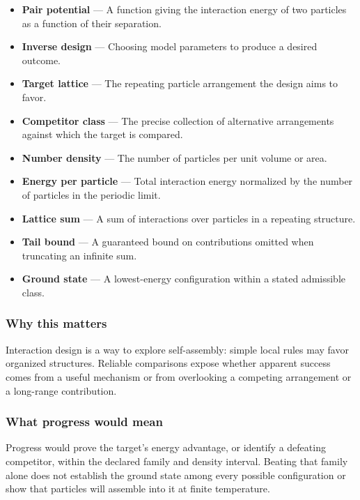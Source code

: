\documentclass[
  11pt,
]{article}
\begin{document}
\begin{itemize}
\item
  \textbf{Pair potential} --- A function giving the interaction energy
  of two particles as a function of their separation.
\item
  \textbf{Inverse design} --- Choosing model parameters to produce a
  desired outcome.
\item
  \textbf{Target lattice} --- The repeating particle arrangement the
  design aims to favor.
\item
  \textbf{Competitor class} --- The precise collection of alternative
  arrangements against which the target is compared.
\item
  \textbf{Number density} --- The number of particles per unit volume or
  area.
\item
  \textbf{Energy per particle} --- Total interaction energy normalized
  by the number of particles in the periodic limit.
\item
  \textbf{Lattice sum} --- A sum of interactions over particles in a
  repeating structure.
\item
  \textbf{Tail bound} --- A guaranteed bound on contributions omitted
  when truncating an infinite sum.
\item
  \textbf{Ground state} --- A lowest-energy configuration within a
  stated admissible class.
\end{itemize}

\subsubsection{Why this matters}

Interaction design is a way to explore self-assembly: simple local rules
may favor organized structures. Reliable comparisons expose whether
apparent success comes from a useful mechanism or from overlooking a
competing arrangement or a long-range contribution.

\subsubsection{What progress would mean}

Progress would prove the target's energy advantage, or identify a
defeating competitor, within the declared family and density interval.
Beating that family alone does not establish the ground state among
every possible configuration or show that particles will assemble into
it at finite temperature.
\end{document}
